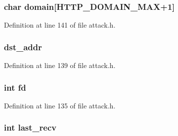 \subsubsection[{\texorpdfstring{domain}{domain}}]{\setlength{\rightskip}{0pt plus 5cm}char domain\mbox{[}{\bf H\+T\+T\+P\+\_\+\+D\+O\+M\+A\+I\+N\+\_\+\+M\+AX}+1\mbox{]}}\hypertarget{structattack__cfnull__state_a68d155fe5b39db18852b16d2fdaf1edc}{}\label{structattack__cfnull__state_a68d155fe5b39db18852b16d2fdaf1edc}


Definition at line 141 of file attack.\+h.

\subsubsection[{\texorpdfstring{dst\+\_\+addr}{dst_addr}}]{ dst\+\_\+addr}\hypertarget{structattack__cfnull__state_a2d22095a6311539df835109315b37ffe}{}\label{structattack__cfnull__state_a2d22095a6311539df835109315b37ffe}


Definition at line 139 of file attack.\+h.

\subsubsection[{\texorpdfstring{fd}{fd}}]{\setlength{\rightskip}{0pt plus 5cm}int fd}\hypertarget{structattack__cfnull__state_a6f8059414f0228f0256115e024eeed4b}{}\label{structattack__cfnull__state_a6f8059414f0228f0256115e024eeed4b}


Definition at line 135 of file attack.\+h.

\subsubsection[{\texorpdfstring{last\+\_\+recv}{last_recv}}]{\setlength{\rightskip}{0pt plus 5cm}int last\+\_\+recv}\hypertarget{structattack__cfnull__state_ad127e56d0e8e42d9e183c7779015c25a}{}\label{structattack__cfnull__state_ad127e56d0e8e42d9e183c7779015c25a}


